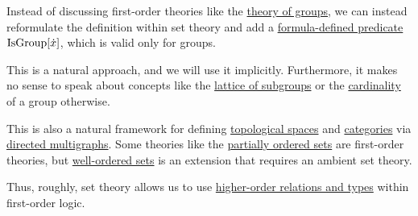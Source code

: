 \begin{remark}\label{rem:first_order_theories_in_zfc}
  Instead of discussing first-order theories like the \hyperref[def:group/theory]{theory of groups}, we can instead reformulate the definition within set theory and add a \hyperref[con:formula_defined_predicate]{formula-defined predicate} \( \op{IsGroup}[\synx] \), which is valid only for groups.

  This is a natural approach, and we will use it implicitly. Furthermore, it makes no sense to speak about concepts like the \hyperref[thm:substructures_form_complete_lattice]{lattice of subgroups} or the \hyperref[def:cardinal]{cardinality} of a group otherwise.

  This is also a natural framework for defining \hyperref[def:topological_space]{topological spaces} and \hyperref[def:category]{categories} via \hyperref[def:directed_multigraph]{directed multigraphs}. Some theories like the \hyperref[def:partially_ordered_set]{partially ordered sets} are first-order theories, but \hyperref[def:well_ordered_set]{well-ordered sets} is an extension that requires an ambient set theory.

  Thus, roughly, set theory allows us to use \hyperref[rem:higher_order_logic]{higher-order relations and types} within first-order logic.
\end{remark}
